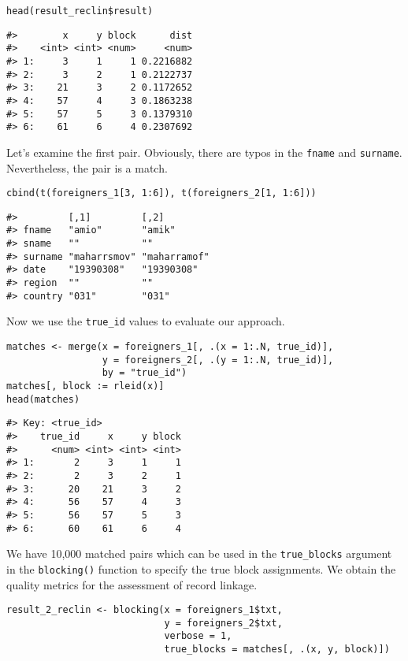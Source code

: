 \begin{verbatim}
head(result_reclin$result)
\end{verbatim}

\begin{verbatim}
#>        x     y block      dist
#>    <int> <int> <num>     <num>
#> 1:     3     1     1 0.2216882
#> 2:     3     2     1 0.2122737
#> 3:    21     3     2 0.1172652
#> 4:    57     4     3 0.1863238
#> 5:    57     5     3 0.1379310
#> 6:    61     6     4 0.2307692
\end{verbatim}

Let's examine the first pair. Obviously, there are typos in the \texttt{fname}
and \texttt{surname}. Nevertheless, the pair is a match.

\begin{verbatim}
cbind(t(foreigners_1[3, 1:6]), t(foreigners_2[1, 1:6]))
\end{verbatim}

\begin{verbatim}
#>         [,1]         [,2]        
#> fname   "amio"       "amik"      
#> sname   ""           ""          
#> surname "maharrsmov" "maharramof"
#> date    "19390308"   "19390308"  
#> region  ""           ""          
#> country "031"        "031"
\end{verbatim}

Now we use the \texttt{true\_id} values to evaluate our approach.

\begin{verbatim}
matches <- merge(x = foreigners_1[, .(x = 1:.N, true_id)],
                 y = foreigners_2[, .(y = 1:.N, true_id)],
                 by = "true_id")
matches[, block := rleid(x)]
head(matches)
\end{verbatim}

\begin{verbatim}
#> Key: <true_id>
#>    true_id     x     y block
#>      <num> <int> <int> <int>
#> 1:       2     3     1     1
#> 2:       2     3     2     1
#> 3:      20    21     3     2
#> 4:      56    57     4     3
#> 5:      56    57     5     3
#> 6:      60    61     6     4
\end{verbatim}

We have 10,000 matched pairs which can be used in the \texttt{true\_blocks} argument in the
\texttt{blocking()} function to specify the true block assignments. We obtain the
quality metrics for the assessment of record linkage.

\begin{verbatim}
result_2_reclin <- blocking(x = foreigners_1$txt,
                            y = foreigners_2$txt,
                            verbose = 1,
                            true_blocks = matches[, .(x, y, block)])
\end{verbatim}

